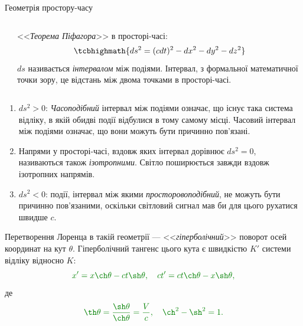 \documentclass[]{beamer}
\begin{document}
\begin{frame}{Геометрія простору-часу}{}
\begin{columns}
\begin{column}{0.4\linewidth}
\begin{pict}
			\end{pict}
		\end{column}
		\begin{column}{0.6\linewidth}
			\begin{block}{}\justifying
				<<\emph{\color{blue}Теорема Піфагора}>> в просторі-часі:
				\begin{equation*}%
					\tcbhighmath{
						ds^2 = (cdt)^2 - dx^2 - dy^2 - dz^2
					}
				\end{equation*}
				{\color{blue} $ ds $} називається \emph{\color{blue}інтервалом} між подіями. Інтервал, з формальної математичної точки зору, це відстань між
				двома точками в просторі-часі.
			\end{block}
		\end{column}
	\end{columns}
	\vspace*{10pt}
	\begin{overprint}
		\begin{enumerate}\small\justifying
			\item $ds^2 > 0$: \emph{\color{blue}Часоподібний} інтервал між подіями означає, що існує така система відліку, в якій обидві події
			      відбулися в тому самому місці. Часовий інтервал між подіями означає, що вони можуть бути причинно пов'язані.
			\item Напрями у просторі-часі, вздовж яких інтервал дорівнює $ds^2 = 0$, називаються також \emph{\color{blue}ізотропними}. Світло
			      поширюється завжди вздовж ізотропних напрямів.
			\item $ds^2  < 0$: події, інтервал між якими \emph{\color{blue}просторовоподібний}, не можуть бути причинно
			      пов'язаними, оскільки світловий сигнал мав би для цього рухатися швидше $c$.
		\end{enumerate}
		Перетворення Лоренца в такій геометрії --- <<\emph{\color{blue}гіперболічний}>> поворот осей координат на кут $ \theta $. Гіперболічний тангенс цього кута є швидкістю $ K' $ системи відліку відносно $ K $:
		\begin{equation*}\color{green!50!black}
			x' = x\ch\theta - ct\sh\theta, \quad ct' = ct\ch\theta - x \sh\theta ,
		\end{equation*}
		де
		\begin{equation*}\color{green!50!black}
			\th\theta = \frac{\sh\theta}{\ch\theta} = \frac{V}{c}, \quad \ch^2 - \sh^2 = 1.
		\end{equation*}


\end{overprint}
\end{frame}
\end{document}
